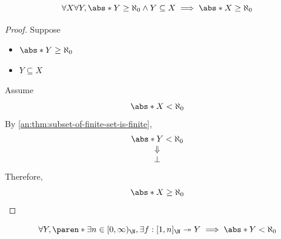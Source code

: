 \bigskip

\begin{corollary} \label{an:cor:infinite-subset-implies-infinite}
  \[
    \forall X \forall Y, \abs*{Y} \geq \aleph_{0} \land Y \subseteq X \implies \abs*{X} \geq \aleph_{0}
  \]
\end{corollary}

\begin{proof}
  Suppose
  \begin{itemize}
    \item $\abs*{Y} \geq \aleph_{0}$
    \item $Y \subseteq X$
  \end{itemize}
  Assume
  \[
    \abs*{X} < \aleph_{0}
  \]
  By \cref{an:thm:subset-of-finite-set-is-finite},
  \[
    \begin{array}{c}
      \abs*{Y} < \aleph_{0} \\
      \Downarrow            \\
      \bot
    \end{array}
  \]
  Therefore,
  \[
    \abs*{X} \geq \aleph_{0}
  \]
\end{proof}

\bigskip

\begin{lemma} \label{an:lem:surjection-from-Nn-implies-finite}
  \[
    \forall Y, \paren*{\exists n \in [0, \infty)_{\N}, \exists f: [1, n]_{\N} \twoheadrightarrow Y}
    \implies \abs*{Y} < \aleph_{0}
  \]
\end{lemma}

